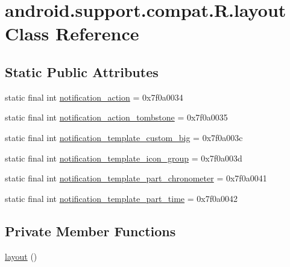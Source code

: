 \hypertarget{classandroid_1_1support_1_1compat_1_1_r_1_1layout}{}\section{android.\+support.\+compat.\+R.\+layout Class Reference}
\label{classandroid_1_1support_1_1compat_1_1_r_1_1layout}
\subsection*{Static Public Attributes}
\begin{DoxyCompactItemize}
\item 
static final int \mbox{\hyperlink{classandroid_1_1support_1_1compat_1_1_r_1_1layout_ad79e4fe83c760de6618f10481cf5fcc0}{notification\+\_\+action}} = 0x7f0a0034
\item 
static final int \mbox{\hyperlink{classandroid_1_1support_1_1compat_1_1_r_1_1layout_af9477b0f36fd53636d0a5d7bd5886ce4}{notification\+\_\+action\+\_\+tombstone}} = 0x7f0a0035
\item 
static final int \mbox{\hyperlink{classandroid_1_1support_1_1compat_1_1_r_1_1layout_a0b54b8630957de0e06eef8abefdf814e}{notification\+\_\+template\+\_\+custom\+\_\+big}} = 0x7f0a003c
\item 
static final int \mbox{\hyperlink{classandroid_1_1support_1_1compat_1_1_r_1_1layout_a5cbbbeccfd09c138a8cc351aa1a7adce}{notification\+\_\+template\+\_\+icon\+\_\+group}} = 0x7f0a003d
\item 
static final int \mbox{\hyperlink{classandroid_1_1support_1_1compat_1_1_r_1_1layout_aeea5b97200646849c345579998f4543e}{notification\+\_\+template\+\_\+part\+\_\+chronometer}} = 0x7f0a0041
\item 
static final int \mbox{\hyperlink{classandroid_1_1support_1_1compat_1_1_r_1_1layout_a6cb602573ee4bfe6e0e12b0493d0350f}{notification\+\_\+template\+\_\+part\+\_\+time}} = 0x7f0a0042
\end{DoxyCompactItemize}
\subsection*{Private Member Functions}
\begin{DoxyCompactItemize}
\item 
\mbox{\hyperlink{classandroid_1_1support_1_1compat_1_1_r_1_1layout_afddcee80f0a158cb1ab1bd4ee049cf30}{layout}} ()
\end{DoxyCompactItemize}


